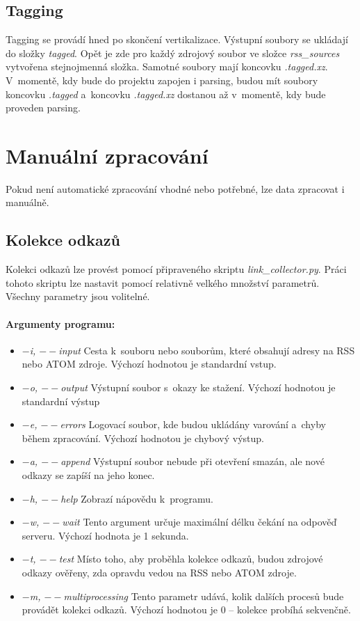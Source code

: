 \subsection{Tagging}
Tagging se provádí hned po skončení vertikalizace. Výstupní soubory se ukládají do složky
\textit{tagged}. Opět je zde pro každý zdrojový soubor ve složce \textit{rss\_sources} vytvořena
stejnojmenná složka. Samotné soubory mají koncovku \textit{.tagged.xz}. V~momentě, kdy bude do
projektu zapojen i parsing, budou mít soubory koncovku \textit{.tagged} a~koncovku \textit{.tagged.xz}
dostanou až v~momentě, kdy bude proveden parsing.

\section{Manuální zpracování}
Pokud není automatické zpracování vhodné nebo potřebné, lze data zpracovat i manuálně.

\subsection{Kolekce odkazů}
Kolekci odkazů lze provést pomocí připraveného skriptu \textit{link\_collector.py}.
Práci tohoto skriptu lze nastavit pomocí relativně velkého množství parametrů. Všechny
parametry jsou volitelné.

\paragraph{Argumenty programu: }
\begin{itemize}
    \item \textit{$-$i, $--$input} Cesta k~souboru nebo souborům, které obsahují adresy na RSS nebo ATOM zdroje. Výchozí hodnotou je standardní vstup.
    \item \textit{$-$o, $--$output} Výstupní soubor s~okazy ke stažení. Výchozí hodnotou je standardní výstup
    \item \textit{$-$e, $--$errors} Logovací soubor, kde budou ukládány varování a~chyby během zpracování. Výchozí hodnotou je chybový výstup.
    \item \textit{$-$a, $--$append} Výstupní soubor nebude při otevření smazán, ale nové odkazy se zapíší na jeho konec.
    \item \textit{$-$h, $--$help} Zobrazí nápovědu k~programu.
    \item \textit{$-$w, $--$wait} Tento argument určuje maximální délku čekání na odpověď serveru. Výchozí hodnota je 1 sekunda.
    \item \textit{$-$t, $--$test} Místo toho, aby proběhla kolekce odkazů, budou zdrojové odkazy ověřeny, zda opravdu vedou na RSS nebo ATOM zdroje.
    \item \textit{$-$m, $--$multiprocessing} Tento parametr udává, kolik dalších procesů bude provádět kolekci odkazů. Výchozí hodnotou je 0 -- kolekce probíhá sekvenčně.
\end{itemize}

